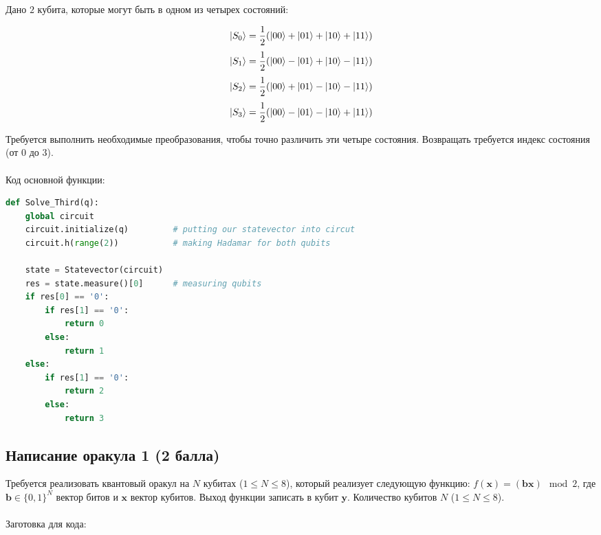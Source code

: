 \documentclass{article}
\begin{document}
Дано $2$ кубита, которые могут быть в одном из четырех состояний:

$$\Ket{S_0} = \frac{1}{2}(\Ket{00} + \Ket{01} + \Ket{10} + \Ket{11})$$
$$\Ket{S_1} = \frac{1}{2}(\Ket{00} - \Ket{01} + \Ket{10} - \Ket{11})$$
$$\Ket{S_2} = \frac{1}{2}(\Ket{00} + \Ket{01} - \Ket{10} - \Ket{11})$$
$$\Ket{S_3} = \frac{1}{2}(\Ket{00} - \Ket{01} - \Ket{10} + \Ket{11})$$


Требуется выполнить необходимые преобразования, чтобы точно различить эти четыре состояния. Возвращать требуется индекс состояния (от $0$ до $3$). 
\\\\
Код основной функции:
\begin{lstlisting}[language=Python]
def Solve_Third(q):
    global circuit
    circuit.initialize(q)         # putting our statevector into circut
    circuit.h(range(2))           # making Hadamar for both qubits
    
    state = Statevector(circuit)
    res = state.measure()[0]      # measuring qubits 
    if res[0] == '0':
        if res[1] == '0':
            return 0
        else:
            return 1
    else:
        if res[1] == '0':
            return 2
        else:
            return 3
\end{lstlisting}


\subsection{Написание оракула 1 (2 балла)}

Требуется реализовать квантовый оракул на $N$ кубитах ($1 \le N \le 8$), который реализует следующую функцию: $f(\pmb{x}) = (\pmb{b}\pmb{x}) \mod 2$, где  $\pmb{b} \in \{0,1\}^N$ вектор битов и  $\pmb{x}$ вектор кубитов. Выход функции записать в кубит $\pmb{y}$. Количество кубитов $N$ ($1 \le N \le 8$). 
\\\\
Заготовка для кода:
\begin{lstlisting}[language=Python]
\end{lstlisting}
\end{document}
